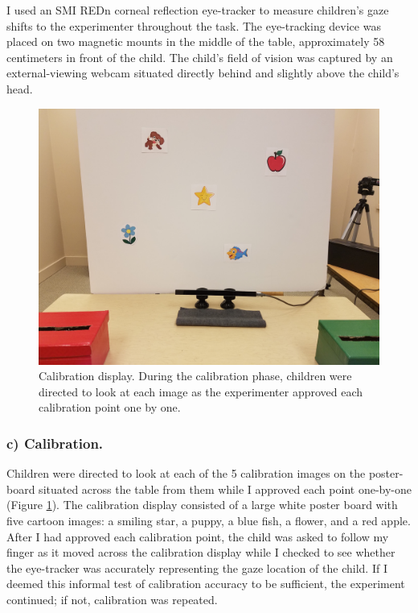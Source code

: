 \documentclass[,man,floatsintext]{apa6}
\begin{document}
I used an SMI REDn corneal reflection eye-tracker to measure children's gaze shifts to the experimenter throughout the task. The eye-tracking device was placed on two magnetic mounts in the middle of the table, approximately 58 centimeters in front of the child. The child's field of vision was captured by an external-viewing webcam situated directly behind and slightly above the child's head.

\begin{figure}
\centering
\includegraphics{../images/calibration.jpg}
\caption{\label{fig:calibration}Calibration display. During the calibration phase, children were directed to look at each image as the experimenter approved each calibration point one by one.}
\end{figure}

\hypertarget{c-calibration.}{%
\subsubsection{c) Calibration.}\label{c-calibration.}}

Children were directed to look at each of the 5 calibration images on the poster-board situated across the table from them while I approved each point one-by-one (Figure \ref{fig:calibration}). The calibration display consisted of a large white poster board with five cartoon images: a smiling star, a puppy, a blue fish, a flower, and a red apple. After I had approved each calibration point, the child was asked to follow my finger as it moved across the calibration display while I checked to see whether the eye-tracker was accurately representing the gaze location of the child. If I deemed this informal test of calibration accuracy to be sufficient, the experiment continued; if not, calibration was repeated.
\end{document}
